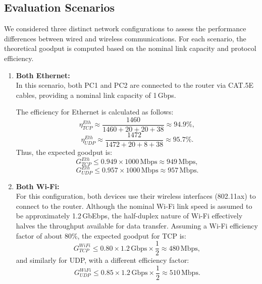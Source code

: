     \subsection{Evaluation Scenarios} \label{subsec:evaluation-scenarios}

        We considered three distinct network configurations to assess the performance differences between wired and wireless communications. 
        For each scenario, the theoretical goodput is computed based on the nominal link capacity and protocol efficiency.

        \begin{enumerate}

            \item \textbf{Both Ethernet:} \\
            In this scenario, both PC1 and PC2 are connected to the router via CAT.5E cables, providing a nominal link capacity of 1\,Gbps. 

            \noindent The efficiency for Ethernet is calculated as follows:
            \[
            \eta_{TCP}^{Eth} \approx \frac{1460}{1460 + 20 + 20 + 38} \approx 94.9\%,
            \]
            \[
            \eta_{UDP}^{Eth} \approx \frac{1472}{1472 + 20 + 8 + 38} \approx 95.7\%.
            \]
            Thus, the expected goodput is:
            \[
            G_{TCP}^{Eth} \leq 0.949 \times 1000\,\text{Mbps} \approx 949\,\text{Mbps},
            \]
            \[
            G_{UDP}^{Eth} \leq 0.957 \times 1000\,\text{Mbps} \approx 957\,\text{Mbps}.
            \]

            \vspace{0.2cm} %
            

            \item \textbf{Both Wi-Fi:} \\
            For this configuration, both devices use their wireless interfaces (802.11ax) to connect to the router. 
            Although the nominal Wi-Fi link speed is assumed to be approximately 1.2\,GbEbps, the half-duplex nature of Wi-Fi effectively halves the throughput available for data transfer. 
            Assuming a Wi-Fi efficiency factor of about 80\%, the expected goodput for TCP is:
            \[
            G_{TCP}^{WiFi} \leq 0.80 \times 1.2\,\text{Gbps} \times \frac{1}{2} \approx 480\,\text{Mbps},
            \]
            and similarly for UDP, with a different efficiency factor:
            \[
            G_{UDP}^{WiFi} \leq 0.85 \times 1.2\,\text{Gbps} \times \frac{1}{2} \approx 510\,\text{Mbps}.
            \]


\end{enumerate}
